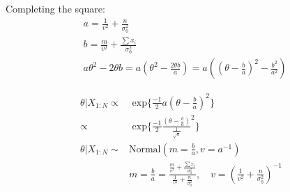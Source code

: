 \documentclass[12pt]{article}
\begin{document}
    \hline

    Completing the square:
    \begin{align*}
        &a =  \frac{1}{v^2} + \frac{n}{\sigma_0 ^2} \\
        &b =  \frac{m}{v^2} + \frac{\sum x_i}{\sigma_0 ^2} \\
        &a \theta ^2 - 2 \theta b = a ( \theta ^2 - \frac{2 \theta b}{a}) =
           a ( (\theta - \frac{b}{a})^2 - \frac{b^2}{a^2})
    \end{align*}
    \hline

    \begin{align*}
    \theta | X_{1:N} \propto& \text{ exp} \big \{ \frac{-1}{2} a (\theta - \frac{b}{a})^2 \big \} \\
        \propto&  \text{ exp} \big \{ \frac{-1}{2} \frac{(\theta - \frac{b}{a})}{\frac{1}{\sqrt{a}}}^2 \big \} \\
    \theta | X_{1:N} \sim& \text{Normal}(m = \frac{b}{a}, v = a^{-1}) \\
    &m = \frac{b}{a}  = \frac{\frac{m}{v^2} + \frac{\sum x_i}{\sigma_0 ^2}} {\frac{1}{v^2} + \frac{n}{\sigma_0 ^2} },
        \quad v = (\frac{1}{v^2} + \frac{n}{\sigma_0 ^2})^{-1}
    \end{align*}
\end{document}
